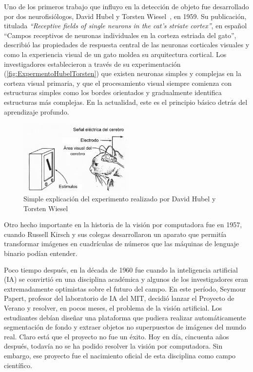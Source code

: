 Uno de los primeros trabajo que influyo en la detección de objeto fue desarrollado por dos neurofisiólogos, David Hubel y Torsten Wiesel~\cite{hubel1959receptive}, en 1959. Su publicación, titulada \textit{``Receptive fields of single neurons in the cat’s striate cortex''}, en español ``Campos receptivos de neuronas individuales en la corteza estriada del gato'', describió las propiedades de respuesta central de las neuronas corticales visuales y como la experiencia visual de un gato moldea su arquitectura cortical. Los investigadores establecieron a través de su experimentación (\autoref{fig:ExpermentoHubelTorsten}) que existen neuronas simples y complejas en la corteza visual primaria, y que el procesamiento visual siempre comienza con estructuras simples como los bordes orientados y gradualmente identifica estructuras más complejas. En la actualidad, este es el principio básico detrás del aprendizaje profundo.\\

\begin{figure}
	\centering
	\includegraphics[width=0.5\textwidth]{img/cat.jpg}
	\caption{Simple explicación del experimento realizado por David Hubel y Torsten Wiesel}
	\label{fig:ExpermentoHubelTorsten}
\end{figure}

Otro hecho importante en la historia de la visión por computadora fue en 1957, cuando Russell Kirsch y sus colegas desarrollaron un aparato que permitía transformar imágenes en cuadrículas de números que las máquinas de lenguaje binario podían entender. 

Poco tiempo después, en la década de 1960 fue cuando la inteligencia artificial (IA) se convirtió en una disciplina académica y algunos de los investigadores eran extremadamente optimistas sobre el futuro del campo. En este período, Seymour Papert, profesor del laboratorio de IA del MIT, decidió lanzar el Proyecto de Verano y resolver, en pocos meses, el problema de la visión artificial. Los estudiantes debían diseñar una plataforma que pudiera realizar automáticamente segmentación de fondo y extraer objetos no superpuestos de imágenes del mundo real. Claro está que el proyecto no fue un éxito.  Hoy en día, cincuenta años después, todavía no se ha podido resolver la visión por computadora. Sin embargo, ese proyecto fue el nacimiento oficial de esta disciplina como campo científico. 

